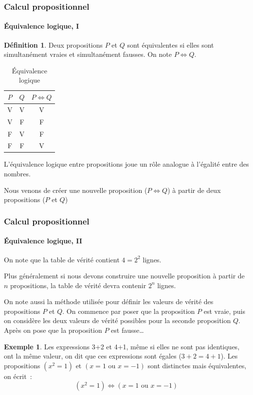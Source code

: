 \documentclass[10pt,notheorems]{beamer}
\theoremstyle{plain}
\theoremstyle{definition} %
\newtheorem{definition}{Définition}
\newtheorem{example}{Exemple}
\begin{document}
\begin{frame}
  \frametitle{Calcul propositionnel}
  \framesubtitle{Équivalence logique, I}

  \begin{definition}\label{def:equivalence}
    Deux propositions $P$ et $Q$ sont équivalentes si elles sont
    simultanément vraies et simultanément fausses. On note
    $P \Leftrightarrow Q$.
  \end{definition}


  \begin{table}[H]
    \centering
    \begin{tabular}[H]{|cc|c|}
      \hline
      $P$ & $Q$ & $P \Leftrightarrow Q$\\ \hline
      V & V & V \\
      V & F & F \\
      F & V & F \\
      F & F & V \\
      \hline\hline
    \end{tabular}
    \caption{Équivalence logique}
    \label{tab:equivalence}
  \end{table}

  \bigskip

  L'équivalence logique entre propositions joue un rôle analogue à
  l'égalité entre des nombres.\newline

  Nous venons de créer une nouvelle proposition
  ($P \Leftrightarrow Q$) à partir de deux propositions ($P$ et $Q$)

\end{frame}

\begin{frame}
  \frametitle{Calcul propositionnel}
  \framesubtitle{Équivalence logique, II}

  On note que la table de vérité contient $4 = 2^{2}$ lignes.\newline

  Plus généralement si nous devons construire une nouvelle proposition
  à partir de $n$ propositions, la table de vérité devra contenir
  $2^{n}$ lignes.\newline

  On note aussi la méthode utilisée pour définir les valeurs de vérité
  des propositions $P$ et $Q$. On commence par poser que la
  proposition $P$ est vraie, puis on considère les deux valeurs de
  vérité possibles pour la seconde proposition $Q$. Après on pose que
  la proposition $P$ est fausse\ldots

    \begin{example}
      Les expressions 3+2 et 4+1, même si elles ne sont pas
      identiques, ont la même valeur, on dit que ces expressions sont
      égales ($3+2=4+1$). Les propositions $(x^{2} = 1)$ et
      $(x=1\text{ ou }x=-1)$ sont distinctes mais équivalentes, on
      écrit :
      \[
        (x^{2} = 1) \Leftrightarrow (x=1\text{ ou }x=-1)
      \]
    \end{example}

  \end{frame}
\end{document}
